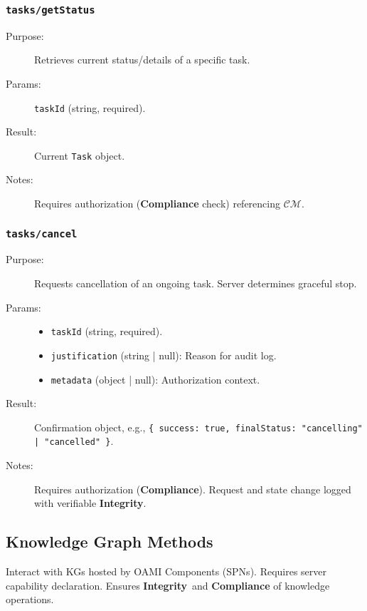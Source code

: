 \documentclass[12pt,a4paper]{report}
\newcommand{\Integrity}{\textbf{Integrity}}
\begin{document}
	\subsubsection{\texttt{tasks/getStatus}}
	\label{app:oami_tasks_getstatus}
	\begin{description}
		\item[Purpose:] Retrieves current status/details of a specific task.
		\item[Params:] \texttt{taskId} (string, required).
		\item[Result:] Current \texttt{Task} object.
		\item[Notes:] Requires authorization (\textbf{Compliance} check) referencing $\mathcal{CM}$.
	\end{description}
	
	\subsubsection{\texttt{tasks/cancel}}
	\label{app:oami_tasks_cancel}
	\begin{description}
		\item[Purpose:] Requests cancellation of an ongoing task. Server determines graceful stop.
		\item[Params:]
		\begin{itemize} \itemsep0em
			\item \texttt{taskId} (string, required).
			\item \texttt{justification} (string | null): Reason for audit log.
			\item \texttt{metadata} (object | null): Authorization context.
		\end{itemize}
		\item[Result:] Confirmation object, e.g., \texttt{\{ success: true, finalStatus: "cancelling" | "cancelled" \}}.
		\item[Notes:] Requires authorization (\textbf{Compliance}). Request and state change logged with verifiable \Integrity.
	\end{description}
	
	\subsection{Knowledge Graph Methods}
	\label{app:oami_kg_methods}
	
	Interact with KGs hosted by OAMI Components (SPNs). Requires server capability declaration. Ensures \Integrity\ and \textbf{Compliance} of knowledge operations.
	
\end{document}
